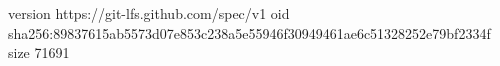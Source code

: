 version https://git-lfs.github.com/spec/v1
oid sha256:89837615ab5573d07e853c238a5e55946f30949461ae6c51328252e79bf2334f
size 71691
